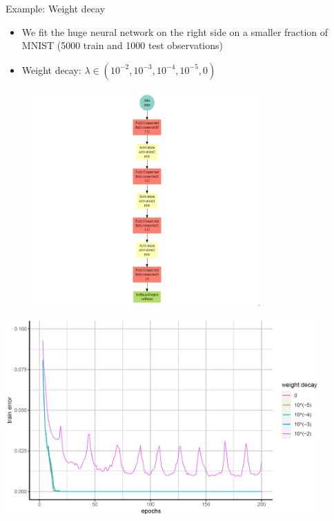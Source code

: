 \begin{vbframe}{Example: Weight decay}
  \begin{minipage}{0.45\textwidth}
  \begin{itemize}
    \item We fit the huge neural network on the right side on a smaller fraction of MNIST (5000 train and 1000 test observations)
    \item Weight decay: $\lambda \in (10^{-2}, 10^{-3}, 10^{-4}, 10^{-5}, 0)$
  \end{itemize}
  \end{minipage}
  \begin{minipage}{0.45\textwidth}
  \begin{figure}
    \centering
      \includegraphics[width=8.7cm]{plots/mxnet_graph_decay.png}
  \end{figure}
  \end{minipage}
  
\framebreak

\begin{center}
\includegraphics[width=0.9\textwidth]{plots/weight-decay01.png}
\end{center}


\end{vbframe}
